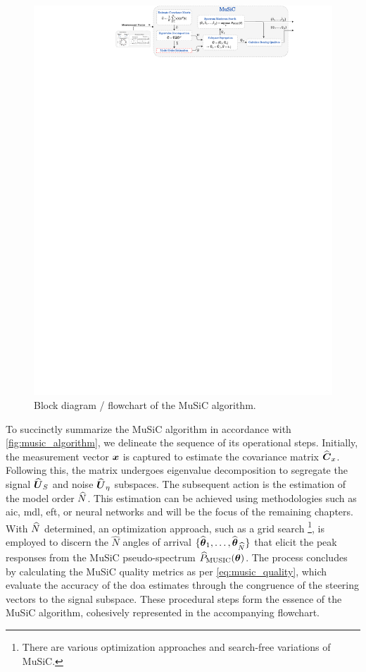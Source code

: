\begin{figure}[H]
    \centering
    \includegraphics[width=1\textwidth]{figures/03_music/MuSiC.pdf}
    \caption{Block diagram / flowchart of the MuSiC algorithm.}
    \label{fig:music_algorithm}
\end{figure}

To succinctly summarize the MuSiC algorithm in accordance with \autoref{fig:music_algorithm}, we delineate the sequence
of its operational steps. Initially, the measurement vector \( \boldsymbol{x} \) is captured to estimate the covariance
matrix \( \widehat{\boldsymbol{C}}_x \). Following this, the matrix undergoes eigenvalue decomposition to segregate the signal \( \widehat{\boldsymbol{U}}_S \) and
noise \( \widehat{\boldsymbol{U}}_\eta \) subspaces. The subsequent action is the estimation of
the model order \( \widehat{N} \). This estimation can be achieved using methodologies such as \gls{aic}, \gls{mdl}, \gls{eft},
or neural networks and will be the focus of the remaining chapters.
With \( \widehat{N} \) determined, an optimization approach, such as a grid search
\footnote{There are various optimization approaches and search-free variations of MuSiC.},
is employed to discern the \( \widehat{N} \) angles of arrival \( \{\widehat{\boldsymbol{\theta}}_1, \ldots, \widehat{\boldsymbol{\theta}}_{\widehat{N}}\} \)
that elicit the peak responses from the MuSiC pseudo-spectrum \( \widehat{P}_{\text{MUSIC}}(\boldsymbol{\theta}) \).
The process concludes by calculating the MuSiC quality metrics as per \autoref{eq:music_quality}, which evaluate the accuracy of the \gls{doa}
estimates through the congruence of the steering vectors to the signal subspace. These procedural steps form the essence
of the MuSiC algorithm, cohesively represented in the accompanying flowchart.

